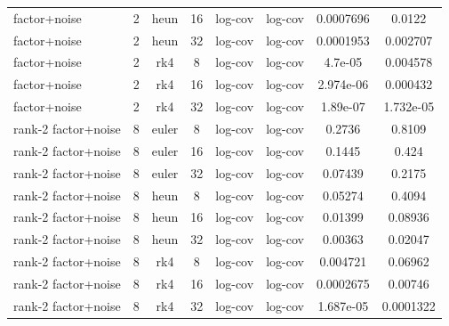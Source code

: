 \begin{tabular}{llcccccc}
factor+noise & 2 & heun & 16 & log-cov & log-cov & 0.0007696 & 0.0122 \\
factor+noise & 2 & heun & 32 & log-cov & log-cov & 0.0001953 & 0.002707 \\
factor+noise & 2 & rk4 & 8 & log-cov & log-cov & 4.7e-05 & 0.004578 \\
factor+noise & 2 & rk4 & 16 & log-cov & log-cov & 2.974e-06 & 0.000432 \\
factor+noise & 2 & rk4 & 32 & log-cov & log-cov & 1.89e-07 & 1.732e-05 \\
rank-2 factor+noise & 8 & euler & 8 & log-cov & log-cov & 0.2736 & 0.8109 \\
rank-2 factor+noise & 8 & euler & 16 & log-cov & log-cov & 0.1445 & 0.424 \\
rank-2 factor+noise & 8 & euler & 32 & log-cov & log-cov & 0.07439 & 0.2175 \\
rank-2 factor+noise & 8 & heun & 8 & log-cov & log-cov & 0.05274 & 0.4094 \\
rank-2 factor+noise & 8 & heun & 16 & log-cov & log-cov & 0.01399 & 0.08936 \\
rank-2 factor+noise & 8 & heun & 32 & log-cov & log-cov & 0.00363 & 0.02047 \\
rank-2 factor+noise & 8 & rk4 & 8 & log-cov & log-cov & 0.004721 & 0.06962 \\
rank-2 factor+noise & 8 & rk4 & 16 & log-cov & log-cov & 0.0002675 & 0.00746 \\
rank-2 factor+noise & 8 & rk4 & 32 & log-cov & log-cov & 1.687e-05 & 0.0001322 \\
\bottomrule
\end{tabular}

